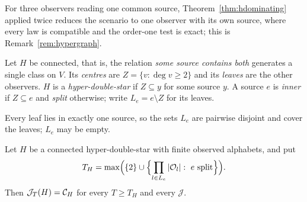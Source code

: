 For three observers reading one common source, Theorem~\ref{thm:hdominating} applied twice reduces the scenario to one observer with its own source, where every law is compatible and the order-one test is exact; this is Remark~\ref{rem:hypergraph}.

\begin{definition}\label{def:hds}
Let $H$ be connected, that is, the relation \emph{some source contains both} generates a single class on $V$. Its \emph{centres} are $Z=\{v:\deg v\ge2\}$ and its \emph{leaves} are the other observers. $H$ is a \emph{hyper-double-star} if $Z\subseteq y$ for some source $y$. A source $e$ is \emph{inner} if $Z\subseteq e$ and \emph{split} otherwise; write $L_e=e\setminus Z$ for its leaves.
\end{definition}

Every leaf lies in exactly one source, so the sets $L_e$ are pairwise disjoint and cover the leaves; $L_e$ may be empty.

\begin{theorem}\label{thm:hds}
Let $H$ be a connected hyper-double-star with finite observed alphabets, and put
\[
T_H=\max\Bigl(\{2\}\cup\Bigl\{\prod_{l\in L_e}|\mathcal O_l|:\ e\text{ split}\Bigr\}\Bigr).
\]
Then $\mathcal J_T(H)=\mathcal C_{H}$ for every $T\ge T_H$ and every $\mathcal J$.
\end{theorem}

